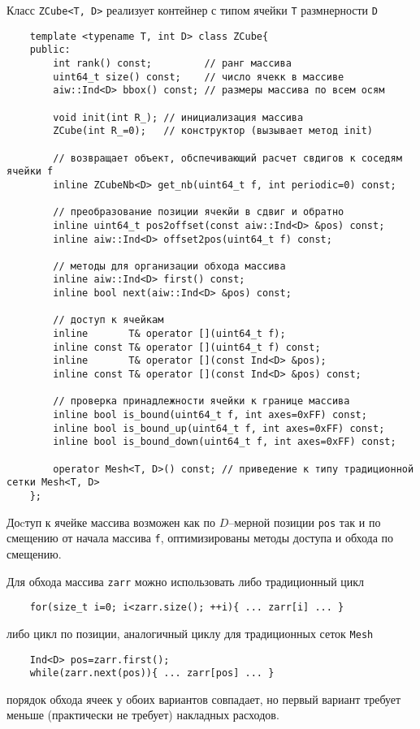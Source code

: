 Класс \verb'ZCube<T, D>' реализует контейнер с типом ячейки \verb'T' размнерности \verb'D'
\begin{verbatim}
    template <typename T, int D> class ZCube{
    public:
        int rank() const;         // ранг массива
        uint64_t size() const;    // число ячекк в массиве
        aiw::Ind<D> bbox() const; // размеры массива по всем осям
		
        void init(int R_); // инициализация массива
        ZCube(int R_=0);   // конструктор (вызывает метод init)

        // возвращает объект, обспечивающий расчет свдигов к соседям ячейки f
        inline ZCubeNb<D> get_nb(uint64_t f, int periodic=0) const;

        // преобразование позиции ячекйи в сдвиг и обратно
        inline uint64_t pos2offset(const aiw::Ind<D> &pos) const;
        inline aiw::Ind<D> offset2pos(uint64_t f) const;

        // методы для организации обхода массива
        inline aiw::Ind<D> first() const;
        inline bool next(aiw::Ind<D> &pos) const;

        // доступ к ячейкам
        inline       T& operator [](uint64_t f);
        inline const T& operator [](uint64_t f) const;
        inline       T& operator [](const Ind<D> &pos);
        inline const T& operator [](const Ind<D> &pos) const;

        // проверка принадлежности ячейки к границе массива
        inline bool is_bound(uint64_t f, int axes=0xFF) const;
        inline bool is_bound_up(uint64_t f, int axes=0xFF) const;
        inline bool is_bound_down(uint64_t f, int axes=0xFF) const;

        operator Mesh<T, D>() const; // приведение к типу традиционной сетки Mesh<T, D>
    };
\end{verbatim}
Доcтуп к ячейке массива возможен как по $D$--мерной позиции \verb'pos' так и по смещению от начала массива \verb'f',
оптимизированы методы доступа и обхода по смещению. 

Для обхода массива \verb'zarr' можно использовать либо традиционный цикл
\begin{verbatim}
    for(size_t i=0; i<zarr.size(); ++i){ ... zarr[i] ... }
\end{verbatim}
либо цикл по позиции, аналогичный циклу для традиционных сеток \verb'Mesh'
\begin{verbatim}
    Ind<D> pos=zarr.first();
    while(zarr.next(pos)){ ... zarr[pos] ... }
\end{verbatim}
порядок обхода ячеек у обоих вариантов совпадает, но первый вариант требует меньше (практически не требует) накладных расходов.

